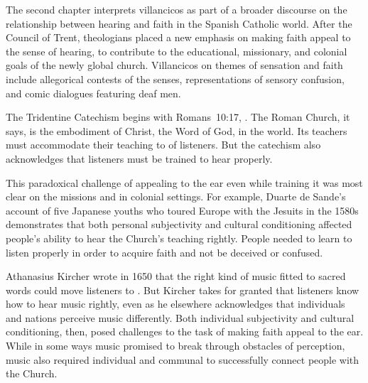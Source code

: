 \documentclass{vcbook-proposal}
\begin{document}
The second chapter interprets villancicos as part of a broader discourse on the 
relationship between hearing and faith in the Spanish Catholic world.
After the Council of Trent, theologians placed a new emphasis on making faith 
appeal to the sense of hearing, to contribute to the educational, missionary, 
and colonial goals of the newly global church.
Villancicos on themes of sensation and faith include allegorical contests of 
the senses, representations of sensory confusion, and comic dialogues featuring 
deaf men.

The Tridentine Catechism begins with Romans~10:17, .%
    \Autocite{Catholic:Catechismus1614}
The Roman Church, it says, is the embodiment of Christ, the Word of God, in the 
world.
Its teachers must accommodate their teaching to  of listeners.
But the catechism also acknowledges that listeners must be trained to hear 
properly.

This paradoxical challenge of appealing to the ear even while training it was 
most clear on the missions and in colonial settings.
For example, Duarte de Sande's account of five Japanese youths who toured Europe
with the Jesuits in the 1580s demonstrates that both personal subjectivity and
cultural conditioning affected people's ability to hear the Church's teaching
rightly.%
  \Autocite{Massarella:JapaneseTravellers}
People needed to learn to listen properly in order to acquire faith and not be 
deceived or confused.

Athanasius Kircher wrote in 1650 that the right kind of music fitted to sacred
words could move listeners to .%
  \Autocite{Kircher:Musurgia}
But Kircher takes for granted that listeners know how to hear music rightly, 
even as he elsewhere acknowledges that individuals and nations perceive music 
differently.
Both individual subjectivity and cultural conditioning, then, posed challenges
to the task of making faith appeal to the ear.
While in some ways music promised to break through obstacles of perception, 
music also required individual and communal  to 
successfully connect people with the Church.
\end{document}
